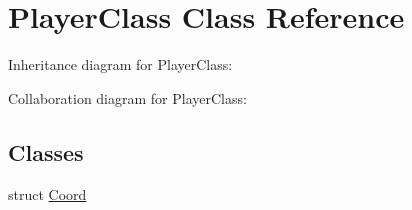 \hypertarget{class_player_class}{}\section{Player\+Class Class Reference}
\label{class_player_class}


Inheritance diagram for Player\+Class\+:


Collaboration diagram for Player\+Class\+:
\subsection*{Classes}
\begin{DoxyCompactItemize}
\item 
struct \mbox{\hyperlink{struct_player_class_1_1_coord}{Coord}}
\end{DoxyCompactItemize}
